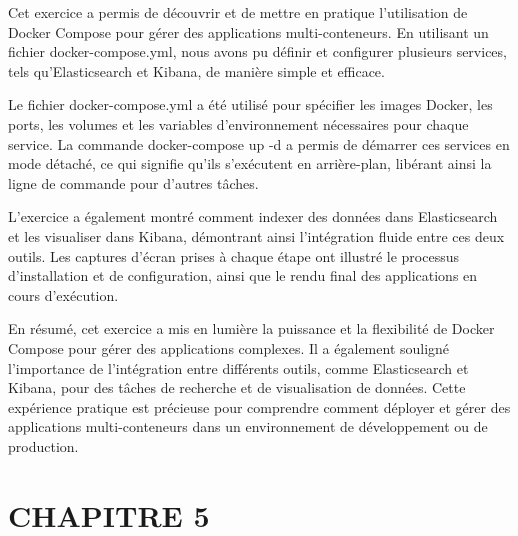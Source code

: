 \documentclass[a4paper,11pt]{article}
\begin{document}
            \begin{tcolorbox}[colback=lightgray!6, colframe=black, left=5mm, right=5mm, top=2mm, bottom=2mm, boxrule=0.1mm]
                Cet exercice a permis de découvrir et de mettre en pratique l'utilisation de Docker Compose pour gérer des applications multi-conteneurs. En utilisant un fichier docker-compose.yml, nous avons pu définir et configurer plusieurs services, tels qu'Elasticsearch et Kibana, de manière simple et efficace.
                
                \bigskip
                Le fichier docker-compose.yml a été utilisé pour spécifier les images Docker, les ports, les volumes et les variables d'environnement nécessaires pour chaque service. La commande docker-compose up -d a permis de démarrer ces services en mode détaché, ce qui signifie qu'ils s'exécutent en arrière-plan, libérant ainsi la ligne de commande pour d'autres tâches.

                \bigskip
                L'exercice a également montré comment indexer des données dans Elasticsearch et les visualiser dans Kibana, démontrant ainsi l'intégration fluide entre ces deux outils. Les captures d'écran prises à chaque étape ont illustré le processus d'installation et de configuration, ainsi que le rendu final des applications en cours d'exécution.

                \bigskip
                En résumé, cet exercice a mis en lumière la puissance et la flexibilité de Docker Compose pour gérer des applications complexes. Il a également souligné l'importance de l'intégration entre différents outils, comme Elasticsearch et Kibana, pour des tâches de recherche et de visualisation de données. Cette expérience pratique est précieuse pour comprendre comment déployer et gérer des applications multi-conteneurs dans un environnement de développement ou de production.
            \end{tcolorbox}
            

        \newpage
        \section{CHAPITRE 5}
\end{document}
